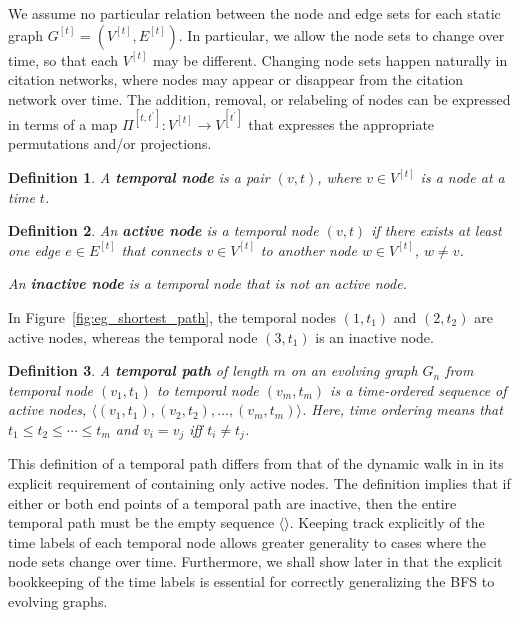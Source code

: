 \documentclass[11pt,conference,compsocconf]{IEEEtran}
\newtheorem{defn}{Definition}
\theoremstyle{definition}
\begin{document}
We assume no particular relation between the node and edge sets for each static
graph $G^{[t]} = (V^{[t]}, E^{[t]})$. In particular, we allow the node sets to
change over time, so that each $V^{[t]}$ may be different. Changing
node sets happen naturally in citation networks, where nodes may appear or
disappear from the citation network over time.
The addition, removal, or relabeling of nodes can be expressed in terms
of a map $\Pi^{[t,t^\prime]} : V^{[t]} \rightarrow V^{[t^\prime]}$ that expresses
the appropriate permutations and/or projections.



\begin{defn}
A \textbf{temporal node} is a pair $(v, t)$, where $v\in V^{[t]}$ is a node at
a time $t$.
\end{defn}


\begin{defn}
An \textbf{active node} is a temporal node $(v,t)$ if there exists at least one
edge $e\in E^{[t]}$ that connects $v\in V^{[t]}$ to another node $w\in V^{[t]}$,
$w\ne v$.

An \textbf{inactive node} is a temporal node that is not an active node.
\end{defn}

In Figure~\ref{fig:eg_shortest_path}, the temporal nodes $(1,t_1)$ and $(2,t_2)$
are active nodes, whereas the temporal node $(3,t_1)$ is an inactive node.


\begin{defn}
A \textbf{temporal path} of length $m$ on an evolving graph $G_n$
from temporal node $(v_1, t_1)$ to temporal node $(v_m, t_m)$ is
a time-ordered sequence of active nodes,
$\langle (v_1, t_1), (v_2, t_2), \ldots, (v_m, t_m) \rangle$.
Here, time ordering means that $t_1 \leq t_2 \leq \cdots \leq t_m$ and
$v_i = v_j$ iff $t_i \ne t_j$.
\end{defn}

This definition of a temporal path differs from that of the dynamic walk
in \cite{gphe11,grihig13} in its explicit requirement of containing only active
nodes. The definition implies that if either or both end points of a temporal
path are inactive, then the entire temporal path must be the empty sequence
$\langle \rangle$. Keeping track explicitly of the time labels of each temporal
node allows greater generality to cases where the node sets change over time.
Furthermore, we shall show later in
that the explicit bookkeeping of the time labels is essential for correctly
generalizing the BFS to evolving graphs.
\end{document}
